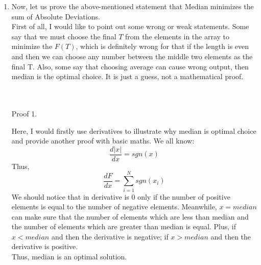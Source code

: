 \documentclass[12pt,a4paper]{article}
\makeatletter
\newtheorem*{solution}{Solution}
\renewenvironment{solution}[1][Solution] {\par\pushQED{\qed}\normalfont\topsep6\p@\@plus6\p@\relax\trivlist\item[\hskip\labelsep\bfseries#1\@addpunct{.}]\ignorespaces}{\popQED\endtrivlist\@endpefalse} \makeatother
\makeatother
\begin{document}
\begin{enumerate}
\begin{solution}
Now, let us prove the above-mentioned statement that Median minimizes the sum of Absolute Deviations.\\
First of all, I would like to point out some wrong or weak statements. Some say that we must choose the final $T$ from the elements in the array to minimize the $F(T)$, which is definitely wrong for that if the length is even and then we can choose any number between the middle two elements as the final T. Also, some say that choosing average can cause wrong output, then median is the optimal choice. It is just a guess, not a mathematical proof.\\
\pagebreak
\\\\

\begin{bf}Proof 1.\end{bf} Here, I would firstly use derivatives to illustrate why median is optimal choice and provide another proof with basic maths.
We all know:
\begin{equation*}
	\frac{d|x|}{dx}=sgn(x)
\end{equation*}
Thus,
\begin{equation*}
	\frac{dF}{dx}=\sum_{i=1}^{N} sgn(x_i)
\end{equation*}
We should notice that in derivative is $0$ only if the number of positive elements is equal to the number of negative elements. Meanwhile, $x=median$ can make sure that the number of elements which are less than median and the number of elements which are greater than median is equal. Plus, if $x<median$ and then the derivative is negative; if $x>median$ and then the derivative is positive.\\Thus, median is an optimal solution.\\


\end{solution}
\end{enumerate}
\end{document}

